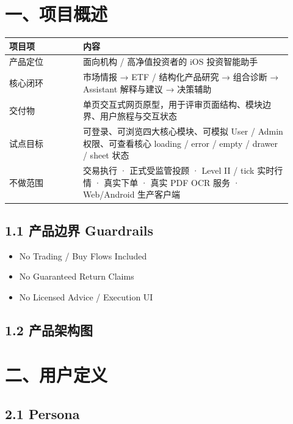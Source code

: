 
\section{一、项目概述}

\begingroup
\small
\begin{longtable}{L{0.24\linewidth}L{0.68\linewidth}}
\toprule
\textbf{项目项} & \textbf{内容} \\
\midrule
产品定位 & 面向机构 / 高净值投资者的 iOS 投资智能助手 \\
核心闭环 & 市场情报 → ETF / 结构化产品研究 → 组合诊断 → Assistant 解释与建议 → 决策辅助 \\
交付物 & 单页交互式网页原型，用于评审页面结构、模块边界、用户旅程与交互状态 \\
试点目标 & 可登录、可浏览四大核心模块、可模拟 User / Admin 权限、可查看核心 loading / error / empty / drawer / sheet 状态 \\
不做范围 & 交易执行 · 正式受监管投顾 · Level II / tick 实时行情 · 真实下单 · 真实 PDF OCR 服务 · Web/Android 生产客户端 \\
\bottomrule
\end{longtable}
\endgroup

\subsection{1.1 产品边界 Guardrails}

\begin{itemize}
\item No Trading / Buy Flows Included
\item No Guaranteed Return Claims
\item No Licensed Advice / Execution UI
\end{itemize}

\subsection{1.2 产品架构图}


\section{二、用户定义}

\subsection{2.1 Persona}

